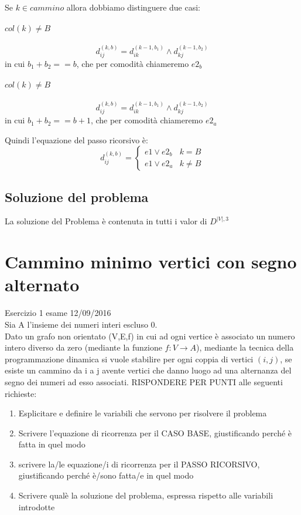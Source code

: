 \documentclass[12pt, a4paper, openany]{book}
\begin{document}
Se $k \in cammino$ allora dobbiamo distinguere due casi:
\paragraph{$col(k) \neq B$}
\begin{equation*}
	d_{ij}^{(k,b)} = d_{ik}^{(k-1,b_1)} \land d_{kj}^{(k-1,b_2)}
\end{equation*}
in cui $b_1 + b_2 == b$, che per comodità chiameremo $e2_b$
\paragraph{$col(k) \neq B$}
\begin{equation*}
	d_{ij}^{(k,b)} = d_{ik}^{(k-1,b_1)} \land d_{kj}^{(k-1,b_2)}
\end{equation*}
in cui $b_1 + b_2 == b+1$, che per comodità chiameremo $e2_a$

Quindi l'equazione del passo ricorsivo è:
\begin{equation*}
	d^{(k,b)}_{ij} = \begin{cases}
		e1 \lor e2_b & k=B     \\
		e1 \lor e2_a & k\neq B
	\end{cases}
\end{equation*}

\subsection*{Soluzione del problema}
La soluzione del Problema è contenuta in tutti i valor di $D^{|V|,3}$

\section{Cammino minimo vertici con segno alternato} Esercizio 1 esame 12/09/2016\\
Sia A l'insieme dei numeri interi escluso 0.\\
Dato un grafo non orientato (V,E,f) in cui ad ogni vertice è associato un numero intero
diverso da zero (mediante la funzione $f: V\rightarrow A$), mediante la tecnica della
programmazione dinamica si vuole stabilire per ogni coppia di vertici $(i,j)$, se esiste un
cammino da i a j avente vertici che danno luogo ad una alternanza del segno dei numeri
ad esso associati. RISPONDERE PER PUNTI alle seguenti richieste:
\begin{enumerate}
	\item Esplicitare e definire le variabili che servono per risolvere il problema
	\item Scrivere l'equazione di ricorrenza per il CASO BASE, giustificando perché è fatta in quel modo
	\item scrivere la/le equazione/i di ricorrenza per il PASSO RICORSIVO, giustificando perché è/sono fatta/e in quel modo
	\item Scrivere qualè la soluzione del problema, espressa rispetto alle variabili introdotte
\end{enumerate}
\end{document}
